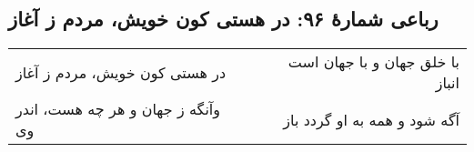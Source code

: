 \begin{center}
\section*{رباعی شمارهٔ ۹۶: در هستی کون خویش، مردم ز آغاز}
\label{sec:096}
\begin{longtable}{l p{0.5cm} r}
در هستی کون خویش، مردم ز آغاز
&&
با خلق جهان و با جهان است انباز
\\
وآنگه ز جهان و هر چه هست، اندر وی 
&&
آگه شود و همه به او گردد باز
\\
\end{longtable}
\end{center}
